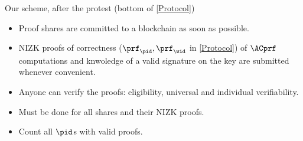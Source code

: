 \begin{columns}[t]
\begin{column}{0.32\linewidth}
    \begin{blackblock}{Our scheme, after the protest (bottom of 
        \cref{Protocol})}
      \begin{itemize}
        \item Proof shares are committed to a blockchain as soon as possible.
        \item \Ac{NIZK} proofs of correctness (\(\prf_\pid, \prf_\wid\) in 
          \cref{Protocol}) of \(\ACprf\) computations and knwoledge of a valid 
          signature on the key are submitted whenever convenient.
        \item Anyone can verify the proofs: eligibility, universal and 
          individual verifiability.
        \item Must be done for all shares and their \ac{NIZK} proofs.
        \item Count all \(\pid\)s with valid proofs.
      \end{itemize}
    \end{blackblock}


\end{column}
\end{columns}
